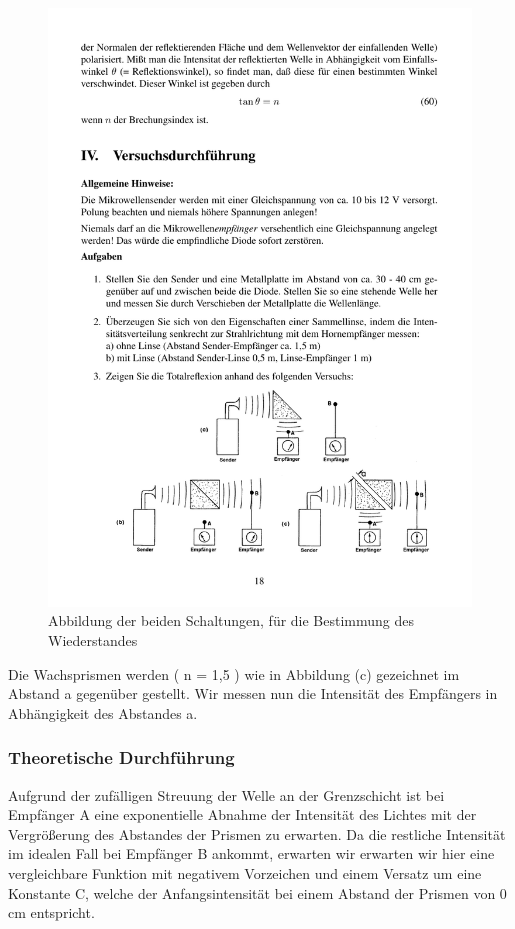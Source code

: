 \documentclass[12pt]{scrartcl}
\begin{document}
\begin{figure}[htbp] 
  \centering
    \includegraphics[trim = 0mm 15mm 0mm 132mm, clip, scale = 1]{totalreflexion.pdf}
  	\caption[Abbildung der beiden Schaltungen, für die Bestimmung des Wiederstandes]{Abbildung der beiden Schaltungen, für die Bestimmung des Wiederstandes\footnotemark}
  \label{fig:abb_versuch_3}
\end{figure}

Die Wachsprismen werden ( n = 1,5 ) wie in Abbildung (c) gezeichnet im Abstand a gegenüber gestellt. Wir messen nun die Intensität des Empfängers in Abhängigkeit des Abstandes a.
\subsubsection{Theoretische Durchführung}
Aufgrund der zufälligen Streuung der Welle an der Grenzschicht ist bei Empfänger A eine exponentielle Abnahme der Intensität des Lichtes mit der Vergrößerung des Abstandes der Prismen zu erwarten. Da die restliche Intensität im idealen Fall bei Empfänger B ankommt, erwarten wir erwarten wir hier eine vergleichbare Funktion mit negativem Vorzeichen und einem Versatz um eine Konstante C, welche der Anfangsintensität bei einem Abstand der Prismen von 0 cm entspricht.
\end{document}
